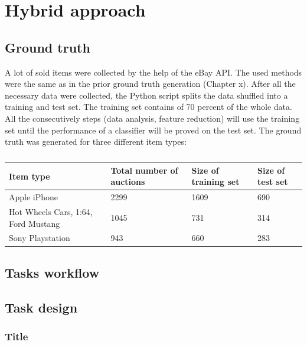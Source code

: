 \section{Hybrid approach}
\subsection{Ground truth}
A lot of sold items were collected by the help of the eBay API. The used methods were the same as in the prior ground truth generation (Chapter x). After all the necessary data were collected, the Python script splits the data shuffled into a training and test set. The training set contains of 70 percent of the whole data. All the consecutively steps (data analysis, feature reduction) will use the training set until the performance of a classifier will be proved on the test set. The ground truth was generated for three different item types:
\begin{table}[h!]
	\begin{center}
	\begin{tabular}{| p{5cm} | l | l | l |}
		\hline
		Item type & Total number of auctions & Size of training set & Size of test set \\
		\hline
		Apple iPhone & 2299 & 1609 & 690 \\
		\hline
		Hot Wheels Cars, 1:64, Ford Mustang & 1045 & 731 & 314 \\
		\hline
		Sony Playstation & 943 & 660 & 283 \\
		\hline
	\end{tabular}
	\end{center}
	\caption{}
\end{table}
\subsection{Tasks workflow}
\subsection{Task design}
\subsubsection{Title}
